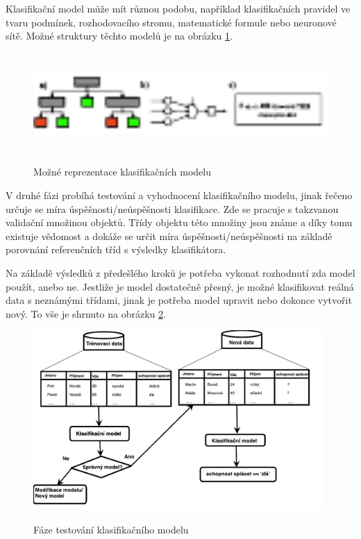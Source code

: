 Klasifikační model může mít různou podobu, například klasifikačních pravidel ve tvaru podmínek, rozhodovacího stromu, matematické formule nebo neuronové sítě. \cite{Han} Možné struktury těchto modelů je na obrázku \ref{modely-clf}.

\begin{figure}[h]\centering
  \centering
  \includegraphics[width=\linewidth,height=1.5in]{obrazky/clf-modely.pdf}\\[1pt]
  \caption{Možné reprezentace klasifikačních modelu}
  \label{modely-clf}
\end{figure}

V druhé fázi probíhá testování a vyhodnocení klasifikačního modelu, jinak řečeno určuje se míra úspěšnosti/neúspěšnosti klasifikace. Zde se pracuje s takzvanou validační množinou objektů. Třídy objektu této množiny jsou známe a díky tomu existuje vědomost a dokáže se určit míra úspěšnosti/neúspěšnosti na základě porovnání referenčních tříd s výsledky klasifikátora.\cite{Han}

Na základě výsledků z předešlého kroků je potřeba vykonat rozhodnutí zda model použít, anebo ne. Jestliže je model dostatečně přesný, je možné klasifikovat reálná data s neznámými třídami, jinak je potřeba model upravit nebo dokonce vytvořit nový. To vše je shrnuto na obrázku \ref{faze-testovani}.

\begin{figure}[h]\centering
  \centering
  \includegraphics[width=\linewidth,height=2.7in]{obrazky/testovaci_faze.pdf}\\[1pt]
  \caption{Fáze testování klasifikačního modelu}
  \label{faze-testovani}
\end{figure}


